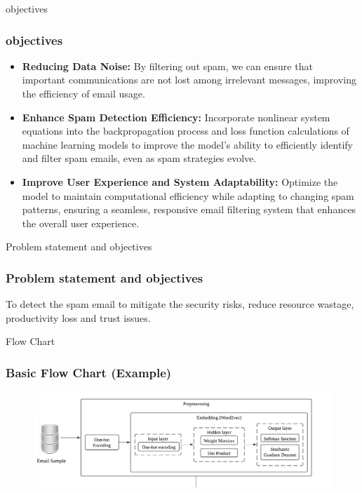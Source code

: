 \documentclass[aspectratio=1610]{beamer}
\begin{document}
\begin{frame}{objectives}
    \frametitle{objectives}
    \begin{itemize}
        \item \textbf{Reducing Data Noise: }By filtering out spam, we can ensure that important communications are not lost among irrelevant messages, improving the efficiency of email usage.
        \item\textbf{Enhance Spam Detection Efficiency: }Incorporate nonlinear system equations into the backpropagation process and loss function calculations of machine learning models to improve the model's ability to efficiently identify and filter spam emails, even as spam strategies evolve.
        \item\textbf{Improve User Experience and System Adaptability: } Optimize the model to maintain computational efficiency while adapting to changing spam patterns, ensuring a seamless, responsive email filtering system that enhances the overall user experience.
    \end{itemize}
    
\end{frame}

\begin{frame}{Problem statement and objectives}
    \frametitle{Problem statement and objectives}
    To  detect the spam email to mitigate the security risks, reduce resource wastage, productivity loss and trust issues. 
    
    
\end{frame}

\begin{frame}{Flow Chart}
    \frametitle{Basic Flow Chart (Example)}
    \begin{figure}
        \centering
        \includegraphics[width = 1.1\linewidth]{NA (1)[2]}
        \label{fig:figure}
    \end{figure}
    
\end{frame}
\end{document}
